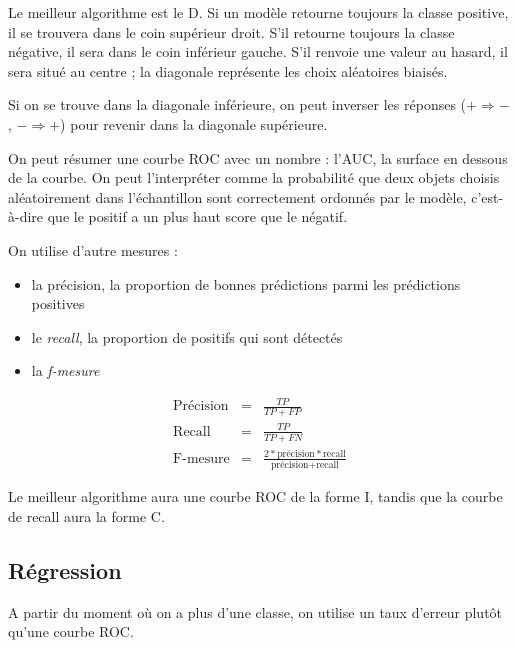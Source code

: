 	
	Le meilleur algorithme est le D. Si un modèle retourne toujours la classe positive, il se trouvera dans le coin supérieur droit. S'il retourne toujours la classe négative, il sera dans le coin inférieur gauche. S'il renvoie une valeur au hasard, il sera situé au centre ; la diagonale représente les choix aléatoires biaisés.
	
	Si on se trouve dans la diagonale inférieure, on peut inverser les réponses ($+ \Rightarrow -$, $- \Rightarrow +$) pour revenir dans la diagonale supérieure.
	
	
	On peut résumer une courbe ROC avec un nombre : l'AUC, la surface en dessous de la courbe. On peut l'interpréter comme la probabilité que deux objets choisis aléatoirement dans l'échantillon sont correctement ordonnés par le modèle, c'est-à-dire que le positif a un plus haut score que le négatif.
	
	On utilise d'autre mesures :
	
	\begin{itemize}
		\item la précision, la proportion de bonnes prédictions parmi les prédictions positives
		\item le \textit{recall}, la proportion de positifs qui sont détectés
		\item la \textit{f-mesure}
	\end{itemize}
	
	\begin{eqnarray*}
	\text{Précision} & = & \frac{TP}{TP + FP} \\
	\text{Recall} & = & \frac{TP}{TP + FN} \\
	\text{F-mesure} & = & \frac{2 * \text{précision} * \text{recall}}{\text{précision} + \text{recall}}
	\end{eqnarray*}
	
	
	Le meilleur algorithme aura une courbe ROC de la forme {\pigpenfont I}, tandis que la courbe de recall aura la forme {\pigpenfont C}.
	
	\subsection{Régression}
	
		A partir du moment où on a plus d'une classe, on utilise un taux d'erreur plutôt qu'une courbe ROC.
	
